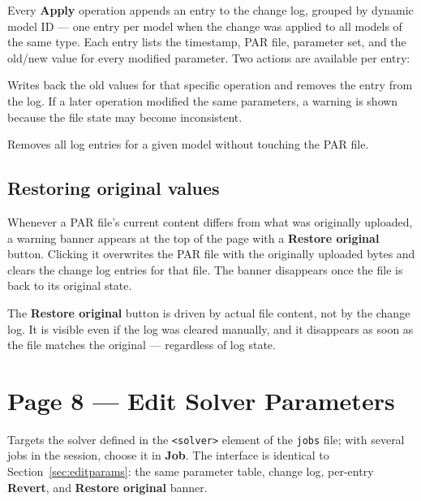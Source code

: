 \documentclass[a4paper,11pt]{article}
\newcommand{\code}[1]{\texttt{\small #1}}
\newcommand{\ftype}[1]{\texttt{\small\color{rteblu}#1}}
\begin{document}
Every \textbf{Apply} operation appends an entry to the change log, grouped by
dynamic model ID --- one entry per model when the change was applied to all
models of the same type. Each entry lists the timestamp, PAR file, parameter set, and
the old/new value for every modified parameter. Two actions are available per
entry:

\begin{description}[leftmargin=2em]
  \item[\textbf{Revert}] Writes back the old values for that specific operation
    and removes the entry from the log. If a later operation modified the same
    parameters, a warning is shown because the file state may become
    inconsistent.
  \item[\textbf{Clear}] Removes all log entries for a given model without
    touching the PAR file.
\end{description}

\subsection{Restoring original values}

Whenever a PAR file's current content differs from what was originally uploaded,
a warning banner appears at the top of the page with a \textbf{Restore original}
button. Clicking it overwrites the PAR file with the originally uploaded bytes
and clears the change log entries for that file. The banner disappears once the
file is back to its original state.

\begin{notebox}
The \textbf{Restore original} button is driven by actual file content, not by
the change log. It is visible even if the log was cleared manually, and it
disappears as soon as the file matches the original --- regardless of log state.
\end{notebox}

\section{Page 8 --- Edit Solver Parameters}

Targets the solver defined in the \code{<solver>} element of the \ftype{jobs}
file; with several jobs in the session, choose it in \textbf{Job}. The
interface is identical to Section~\ref{sec:editparams}: the same
parameter table, change log, per-entry \textbf{Revert}, and
\textbf{Restore original} banner.
\end{document}
